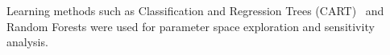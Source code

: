 
Learning methods such as Classification and Regression Trees
(CART)~\cite{breiman2017classification} and Random Forests were used for
parameter space exploration and sensitivity analysis.  





